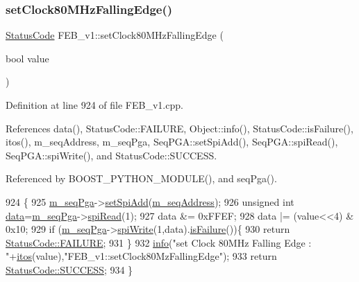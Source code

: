 \subsubsection{\texorpdfstring{set\+Clock80\+M\+Hz\+Falling\+Edge()}{setClock80MHzFallingEdge()}}
{\footnotesize\ttfamily \hyperlink{classStatusCode}{Status\+Code} F\+E\+B\+\_\+v1\+::set\+Clock80\+M\+Hz\+Falling\+Edge (\begin{DoxyParamCaption}\item[{bool}]{value }\end{DoxyParamCaption})}



Definition at line 924 of file F\+E\+B\+\_\+v1.\+cpp.



References data(), Status\+Code\+::\+F\+A\+I\+L\+U\+RE, Object\+::info(), Status\+Code\+::is\+Failure(), itos(), m\+\_\+seq\+Address, m\+\_\+seq\+Pga, Seq\+P\+G\+A\+::set\+Spi\+Add(), Seq\+P\+G\+A\+::spi\+Read(), Seq\+P\+G\+A\+::spi\+Write(), and Status\+Code\+::\+S\+U\+C\+C\+E\+SS.



Referenced by B\+O\+O\+S\+T\+\_\+\+P\+Y\+T\+H\+O\+N\+\_\+\+M\+O\+D\+U\+L\+E(), and seq\+Pga().


\begin{DoxyCode}
924                                                      \{
925   \hyperlink{classFEB__v1_a6c7804ac86796f233a8393043adf2e77}{m\_seqPga}->\hyperlink{classSeqPGA_ac998ce3a6d9b5f2e88cc8393f8c1df53}{setSpiAdd}(\hyperlink{classFEB__v1_a1c1eb093fd1733b9510fcf8bc5c7ad08}{m\_seqAddress});
926   \textcolor{keywordtype}{unsigned} \textcolor{keywordtype}{int} \hyperlink{classFEB__v1_a6bca4320bd3bbbc32efc81097f33421a}{data}=\hyperlink{classFEB__v1_a6c7804ac86796f233a8393043adf2e77}{m\_seqPga}->\hyperlink{classSeqPGA_ab3d0e5e5d4014bc7a92588a76b8713d4}{spiRead}(1);
927   data &= 0xFFEF;
928   data |= (value<<4) & 0x10;
929   \textcolor{keywordflow}{if} (\hyperlink{classFEB__v1_a6c7804ac86796f233a8393043adf2e77}{m\_seqPga}->\hyperlink{classSeqPGA_ad4421841ce4ce8b88ad13f63216f0743}{spiWrite}(1,data).\hyperlink{classStatusCode_a5dd22dc6eb2c52fc4cabc58f6dea2eb7}{isFailure}())\{
930     \textcolor{keywordflow}{return} \hyperlink{classStatusCode_a6f565cbeadc76d14c72f047e5e85eb4ba3da73d4c469762eb9d3c960368252b26}{StatusCode::FAILURE};
931   \}
932   \hyperlink{classObject_a644fd329ea4cb85f54fa6846484b84a8}{info}(\textcolor{stringliteral}{"set Clock 80MHz Falling Edge : "}+\hyperlink{Tools_8h_af330027dbdafb9a30768b3613c553e60}{itos}(value),\textcolor{stringliteral}{"FEB\_v1::setClock80MzFallingEdge"});
933   \textcolor{keywordflow}{return} \hyperlink{classStatusCode_a6f565cbeadc76d14c72f047e5e85eb4badd0da38d3ba0d922efd1f4619bc37ad8}{StatusCode::SUCCESS};
934 \}
\end{DoxyCode}
\mbox{\label{classFEB__v1_af2bb7bacef6c06d15e2c9e47c373de08}} 

